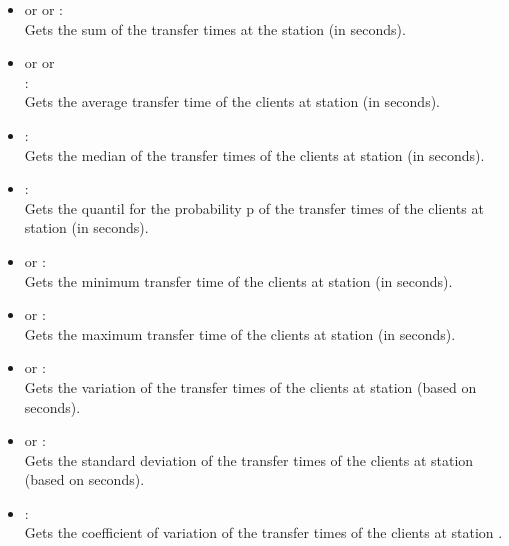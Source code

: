 \begin{itemize}

\item
{} or  or :\\
Gets the sum of the transfer times at the station  (in seconds).

\item
{} or  or\\
:\\
Gets the average transfer time of the clients at station  (in seconds).

\item
{}:\\
Gets the median of the transfer times of the clients at station  (in seconds).

\item
{}:\\
Gets the quantil for the probability p of the transfer times of the clients at station  (in seconds).

\item
{} or :\\
Gets the minimum transfer time of the clients at station  (in seconds).

\item
{} or :\\
Gets the maximum transfer time of the clients at station  (in seconds).

\item
{} or :\\
Gets the variation of the transfer times of the clients at station  (based on seconds).

\item
{} or :\\
Gets the standard deviation of the transfer times of the clients at station  (based on seconds).

\item
{}:\\
Gets the coefficient of variation of the transfer times of the clients at station .


\end{itemize}
